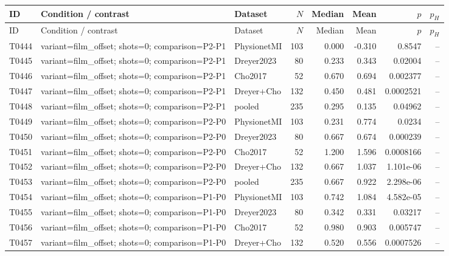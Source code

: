 \begin{longtable}{p{.45in}p{2.6in}p{.75in}rrrrr}
\toprule
ID & Condition / contrast & Dataset & $N$ & Median & Mean & $p$ & $p_H$ \\
\midrule
\endfirsthead
\toprule
ID & Condition / contrast & Dataset & $N$ & Median & Mean & $p$ & $p_H$ \\
\midrule
\endhead
T0444 & variant=film\_\allowbreak{}offset; shots=0; comparison=P2-P1 & PhysionetMI & 103 & 0.000 & -0.310 & 0.8547 & -- \\
T0445 & variant=film\_\allowbreak{}offset; shots=0; comparison=P2-P1 & Dreyer2023 & 80 & 0.233 & 0.343 & 0.02004 & -- \\
T0446 & variant=film\_\allowbreak{}offset; shots=0; comparison=P2-P1 & Cho2017 & 52 & 0.670 & 0.694 & 0.002377 & -- \\
T0447 & variant=film\_\allowbreak{}offset; shots=0; comparison=P2-P1 & Dreyer+Cho & 132 & 0.450 & 0.481 & 0.0002521 & -- \\
T0448 & variant=film\_\allowbreak{}offset; shots=0; comparison=P2-P1 & pooled & 235 & 0.295 & 0.135 & 0.04962 & -- \\
T0449 & variant=film\_\allowbreak{}offset; shots=0; comparison=P2-P0 & PhysionetMI & 103 & 0.231 & 0.774 & 0.0234 & -- \\
T0450 & variant=film\_\allowbreak{}offset; shots=0; comparison=P2-P0 & Dreyer2023 & 80 & 0.667 & 0.674 & 0.000239 & -- \\
T0451 & variant=film\_\allowbreak{}offset; shots=0; comparison=P2-P0 & Cho2017 & 52 & 1.200 & 1.596 & 0.0008166 & -- \\
T0452 & variant=film\_\allowbreak{}offset; shots=0; comparison=P2-P0 & Dreyer+Cho & 132 & 0.667 & 1.037 & 1.101e-06 & -- \\
T0453 & variant=film\_\allowbreak{}offset; shots=0; comparison=P2-P0 & pooled & 235 & 0.667 & 0.922 & 2.298e-06 & -- \\
T0454 & variant=film\_\allowbreak{}offset; shots=0; comparison=P1-P0 & PhysionetMI & 103 & 0.742 & 1.084 & 4.582e-05 & -- \\
T0455 & variant=film\_\allowbreak{}offset; shots=0; comparison=P1-P0 & Dreyer2023 & 80 & 0.342 & 0.331 & 0.03217 & -- \\
T0456 & variant=film\_\allowbreak{}offset; shots=0; comparison=P1-P0 & Cho2017 & 52 & 0.980 & 0.903 & 0.005747 & -- \\
T0457 & variant=film\_\allowbreak{}offset; shots=0; comparison=P1-P0 & Dreyer+Cho & 132 & 0.520 & 0.556 & 0.0007526 & -- \\

\end{longtable}

